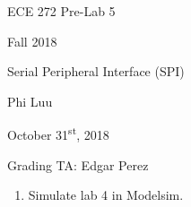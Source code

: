 \documentclass[12pt]{article}
\begin{document}
\begin{titlepage}
  \begin{center} \LARGE
    \vspace*{1.5in}

    ECE 272 Pre-Lab 5

    Fall 2018

    \vfill

    Serial Peripheral Interface (SPI)

    Phi Luu

    \vfill

    October 31\textsuperscript{st}, 2018

    Grading TA: Edgar Perez

    \vspace{1.5in}
  \end{center}
\end{titlepage}

\begin{enumerate}
  \item Simulate lab 4 in Modelsim.


\end{enumerate}
\end{document}
